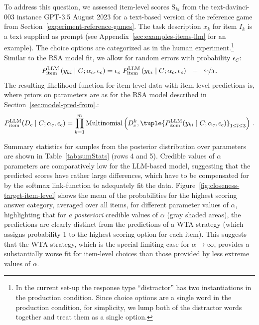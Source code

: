 \documentclass[fleqn]{article}
\begin{document}
To address this question, we assessed item-level scores $\text{S}_{ki}$ from the text-davinci-003 instance GPT-3.5 August 2023 \citep{BrownMann2020:Language-Models} for a text-based version of the reference game from Section~\ref{experiment-reference-games}.
The task description $x_{k}$ for item $I_{k}$ is a text supplied as prompt (see Appendix~\ref{sec:examples-items-llm} for an example).
The choice options are categorized as in the human experiment.\footnote{
  In the current set-up the response type ``distractor'' has two instantiations in the production condition. Since choice options are a single word in the production condition, for simplicity, we lump both of the distractor words together and treat them as a single option.}
Similar to the RSA model fit, we allow for random errors with probability $\epsilon_{C}$:
%
\begin{align*}
  P_{\text{item}}^{\text{LLM}}\left ( y_{ki} \mid C; \alpha_{c}, \epsilon_{c} \right )
  = \epsilon_{c} \  P_{\text{item}}^{\text{LLM}}\left ( y_{ki} \mid C; \alpha_{c}, \epsilon_{c} \right ) \ \ + \ \ \nicefrac{\epsilon_{c}}{3}   \,.
\end{align*}
%
The resulting likelihood function for item-level data with item-level predictions is, where priors on parameters are as for the RSA model described in Section~\ref{sec:model-pred-from}.:
%
\begin{align*}
 P^{\text{LLM}}_{\text{item}}(D_{c} \mid C; \alpha_{c}, \epsilon_{c}) = \prod_{k = 1}^{m} \text{Multinomial} \left ( D_{c}^{k}, \tuple{P^{\text{LLM}}_{\text{item}}(y_{ki} \mid C;  \alpha_{c}, \epsilon_{c})}_{1 \le l \le 3} \right )\,.
\end{align*}
%

Summary statistics for samples from the posterior distribution over parameters are shown in Table~\ref{tab:sumStats} (rows 4 and 5).
Credible values of $\alpha$ parameters are comparatively low for the LLM-based model, suggesting that the predicted scores have rather large differences, which have to be compensated for by the softmax link-function to adequately fit the data.
Figure~\ref{fig:closeness-target-item-level} shows the mean of the probabilities for the highest scoring answer category, averaged over all items, for different parameter values of $\alpha$, highlighting that for \textit{a posteriori} credible values of $\alpha$ (gray shaded areas), the predictions are clearly distinct from the predictions of a WTA strategy (which assigns probability 1 to the highest scoring option for each item).
This suggests that the WTA strategy, which is the special limiting case for $\alpha \rightarrow \infty$, provides a substantially worse fit for item-level choices than those provided by less extreme values of $\alpha$.
\end{document}
